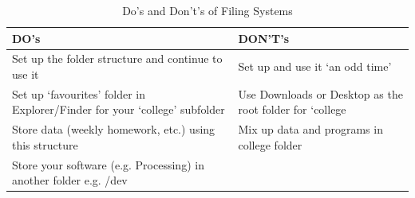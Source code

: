 \documentclass{article}
\begin{document}
\begin{table}[h]
\begin{center}
    \begin{tabular}{ | m{15em}   |m{15em}  }    
        \hline
    \rowcolor{shade3}
    \cellcolor{shade1}DO's & DON'T's   \\ 
     \hline  
     \rowcolor{shade4}
     \cellcolor{shade2} Set up the folder structure and continue to use it 
     & Set up and use it ‘an odd time’
     \\  
     \rowcolor{shade4}
     \hline
     \cellcolor{shade2}Set up ‘favourites’ folder in Explorer/Finder for your ‘college’ subfolder
 & Use Downloads or Desktop as the root folder for ‘college  \\ 
 \hline
     \rowcolor{shade4}
     \cellcolor{shade2}Store data (weekly homework, etc.) using this structure
     &Mix up data and programs in college folder
     \\ 
     \hline
     \rowcolor{shade4}
     \cellcolor{shade2}Store your software (e.g. Processing) in another folder e.g. /dev
 &   \\ 
     \hline
 
  
    \end{tabular}
    \caption{Do's and Don't's of Filing Systems}
    \label{tab:dos-donts}
\end{center}
\end{table}
\end{document}
